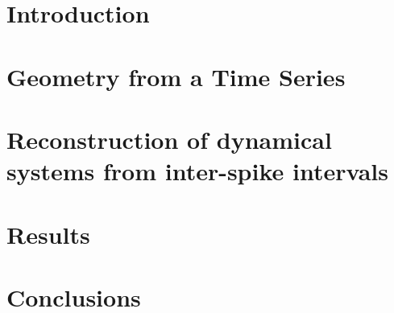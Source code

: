 \documentclass[10pt]{article}
\begin{document}
\maketitle
\section{Introduction}

\section{Geometry from a Time Series}

\section{Reconstruction of dynamical systems from inter-spike intervals}

\section{Results}

\section{Conclusions}
\end{document}
